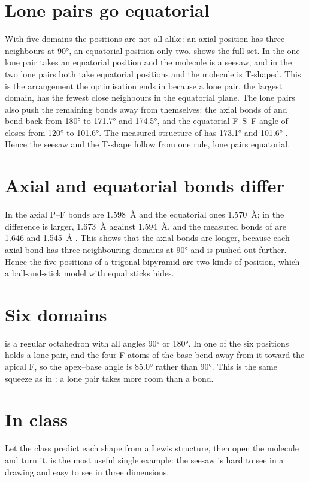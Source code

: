 \section{Lone pairs go equatorial}
With five domains the positions are not all alike: an axial position has three neighbours at \ang{90}, an equatorial position only two.  shows the full set. In  the one lone pair takes an equatorial position and the molecule is a seesaw, and in  the two lone pairs both take equatorial positions and the molecule is T-shaped. This is the arrangement the optimisation ends in because a lone pair, the largest domain, has the fewest close neighbours in the equatorial plane. The lone pairs also push the remaining bonds away from themselves: the axial bonds of  and  bend back from \ang{180} to \ang{171.7} and \ang{174.5}, and the equatorial F--S--F angle of  closes from \ang{120} to \ang{101.6}. The measured structure of  has \ang{173.1} and \ang{101.6} \cite{cccbdb}. Hence the seesaw and the T-shape follow from one rule, lone pairs equatorial.

\section{Axial and equatorial bonds differ}
In  the axial P--F bonds are \SI{1.598}{\angstrom} and the equatorial ones \SI{1.570}{\angstrom}; in  the difference is larger, \SI{1.673}{\angstrom} against \SI{1.594}{\angstrom}, and the measured bonds of  are 1.646 and \SI{1.545}{\angstrom} \cite{cccbdb}. This shows that the axial bonds are longer, because each axial bond has three neighbouring domains at \ang{90} and is pushed out further. Hence the five positions of a trigonal bipyramid are two kinds of position, which a ball-and-stick model with equal sticks hides.

\section{Six domains}
 is a regular octahedron with all angles \ang{90} or \ang{180}. In  one of the six positions holds a lone pair, and the four F atoms of the base bend away from it toward the apical F, so the apex--base angle is \ang{85.0} rather than \ang{90}. This is the same squeeze as in : a lone pair takes more room than a bond.

\section{In class}
Let the class predict each shape from a Lewis structure, then open the molecule and turn it.  is the most useful single example: the seesaw is hard to see in a drawing and easy to see in three dimensions.

